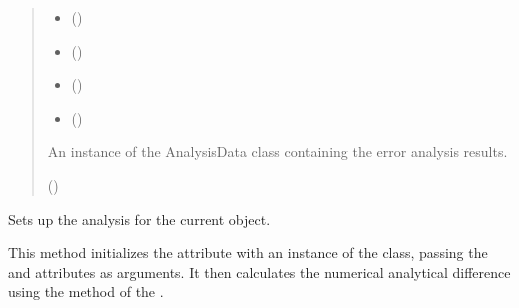 \documentclass[a4paper,11pt,english,openany]{sphinxmanual}
\begin{document}
\begin{fulllineitems}
\begin{fulllineitems}
\begin{quote}
\begin{description}
\begin{itemize}
\item {} 
\sphinxAtStartPar
{} ()

\item {} 
\sphinxAtStartPar
{} ()

\item {} 
\sphinxAtStartPar
{} ()

\item {} 
\sphinxAtStartPar
{} ()

\end{itemize}

\sphinxAtStartPar
An instance of the AnalysisData class containing the error analysis results.

\sphinxAtStartPar
{\hyperref[\detokenize{api/spyice.postprocess.analysis:src.spyice.postprocess.analysis.AnalysisData}]{}} ()

\end{description}\end{quote}

\end{fulllineitems}


\begin{fulllineitems}
\label{\detokenize{api/spyice.postprocess.analysis:src.spyice.postprocess.analysis.Analysis.set_analysis}}
\pysigstartsignatures
\pysiglinewithargsret
{}
{}
{}
\pysigstopsignatures
\sphinxAtStartPar
Sets up the analysis for the current object.

\sphinxAtStartPar
This method initializes the  attribute with an instance of the  class,
passing the  and  attributes as arguments. It then calculates the numerical
analytical difference using the  method of the .
\begin{quote}\begin{description}
\sphinxAtStartPar
{}


\end{description}
\end{quote}
\end{fulllineitems}
\end{fulllineitems}
\end{document}
